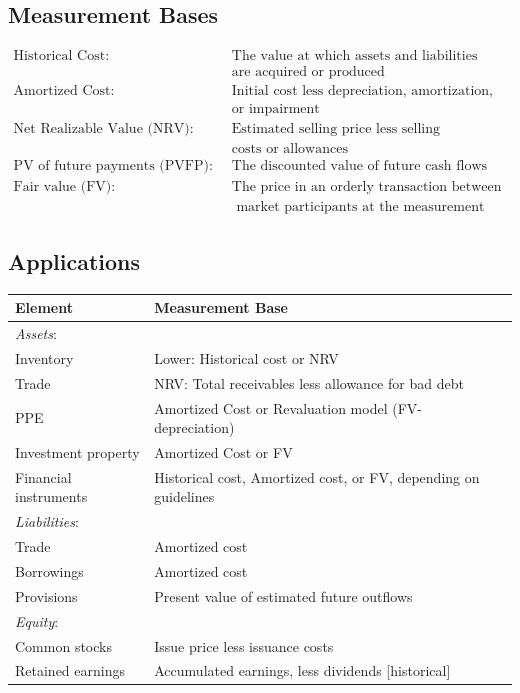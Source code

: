 \documentclass[12pt]{article}
\begin{document}
\subsection{Measurement Bases}
\begin{tcolorbox}
\begin{align*}
	\text{Historical Cost:}\quad & \text{The value at which assets and liabilities} \\
	\quad & \text{are acquired or produced} \\
	\text{Amortized Cost:} \quad & \text{Initial cost less depreciation, amortization,} \\
	\quad & \text{or impairment} \\
	\text{Net Realizable Value (NRV):} \quad & \text{Estimated selling price less selling } \\
	\quad & \text{costs or allowances} \\
	\text{PV of future payments (PVFP):} \quad & \text{The discounted value of future cash flows} \\
	\text{Fair value (FV):} \quad & \text{The price in an orderly transaction between} \\
	\quad & \text{ market participants at the measurement date}
\end{align*}
\end{tcolorbox}

\subsection{Applications}
\begin{tcolorbox}
\begin{tabularx}{\textwidth}{|l|X|}
	\hline
	\textbf{Element} & \textbf{Measurement Base} \\
	\hline
	\textit{Assets}: & \\
	Inventory & Lower: Historical cost or NRV \\
	Trade &  NRV: Total receivables less allowance for bad debt\\
	PPE &  Amortized Cost or Revaluation model (FV- depreciation) \\
	Investment property & Amortized Cost or FV \\
	Financial instruments & Historical cost, Amortized cost, or FV, depending on guidelines \\
	\hline
	\textit{Liabilities}: & \\
	Trade & Amortized cost \\	
	Borrowings & Amortized cost \\
	Provisions & Present value of estimated future outflows \\
	\hline
	\textit{Equity}: & \\
	Common stocks & Issue price less issuance costs \\
	Retained earnings & Accumulated earnings, less dividends [historical]\\
	\hline
\end{tabularx}
\end{tcolorbox}	
\end{document}
